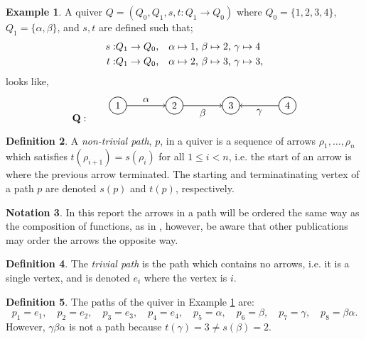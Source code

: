 \documentclass[11.5pt, twoside, a4paper, titlepage]{report}
\providecommand{\equ}[0]{\begin{equation*}}
\providecommand{\eequ}[0] {\end{equation*}}
\theoremstyle{definition}
\newtheorem{mydef}{Definition}[section]
\newtheorem{note}[mydef]{Notation}
\newtheorem{eg}[mydef]{Example}
\theoremstyle{plain}
\begin{document}
\begin{eg} \label{ininquivereg}
A quiver $Q=(Q_0, Q_1, s, t:Q_1 \to Q_0)$ where $Q_0=\{1, 2, 3, 4\}$, $Q_1=\{\alpha, \beta\}$, and $s, t$ are defined such that;
\begin{align*}
s:& Q_1 \to Q_0\text{,\quad} \alpha \mapsto 1\text{, } \beta \mapsto 2\text{, } \gamma \mapsto 4\\
t:& Q_1 \to Q_0\text{,\quad} \alpha \mapsto 2\text{, } \beta \mapsto 3\text{, } \gamma \mapsto 3,
\end{align*}
looks like,
\equ
\mathbf{Q}: \qquad
\begin{tikzpicture}[->,-latex, auto, every path/.style={->, semithick}, main node/.style={draw, circle}]
\node	[main node]		(1) at (0,0)		{1};
\node	[main node]		(2) at (2,0)		{2};
\node	[main node]		(3) at (4,0)		{3};
\node [main node]		(4) at (6,0)		{4};

\draw (1) edge node [auto] {$\alpha$} (2);
\draw (2) edge node [auto, swap] {$\beta$} (3);
\draw (4) edge node [auto] {$\gamma$} (3);
\end{tikzpicture}
\eequ
\end{eg}

\begin{mydef}
A \emph{non-trivial path}, $p$, in a quiver is a sequence of arrows $\rho_1, \dots, \rho_n$ which satisfies $t(\rho_{i+1})=s(\rho_i)$ for all $1\leq i <n$, i.e. the start of an arrow is where the previous arrow terminated. The starting and terminatinating vertex of a path $p$ are denoted $s(p)$ and $t(p)$, respectively.
\end{mydef}

\begin{note}
In this report the arrows in a path will be ordered the same way as the composition of functions, as in \cite{CB2}, however, be aware that other publications may order the arrows the opposite way.
\end{note}

\begin{mydef}
The \emph{trivial path} is the path which contains no arrows, i.e. it is a single vertex, and is denoted $e_i$ where the vertex is $i$.
\end{mydef}

\begin{mydef}
The paths of the quiver in Example \ref{ininquivereg} are:
\equ
p_1=e_1, \quad p_2=e_2, \quad p_3=e_3, \quad p_4=e_4, \quad p_5=\alpha, \quad p_6=\beta, \quad p_7=\gamma, \quad p_8=\beta\alpha.
\eequ
However, $\gamma\beta\alpha$ is not a path because $t(\gamma)=3\neq s(\beta)=2$.
\end{mydef}
\end{document}
